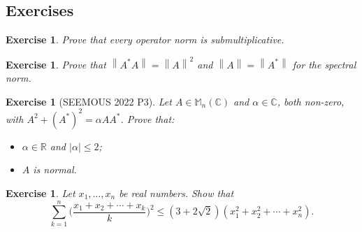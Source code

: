 \documentclass[12pt]{article}
\newcommand{\norm}[1]{\left\lVert #1 \right\rVert}
\theoremstyle{breakplain}
\theoremstyle{breakdef}
\newtheorem{ex}[subsubsection]{Exercise}
\theoremstyle{remark}
\begin{document}
\subsection{Exercises}
\begin{ex}
    Prove that every operator norm is submultiplicative.
\end{ex}
\begin{ex}
    Prove that $\norm{A^*A}=\norm{A}^2$ and $\norm{A}=\norm{A^*}$ for the spectral norm.
\end{ex}
\begin{ex}[SEEMOUS 2022 P3]\label{S22P3}
    Let $A\in \mathbb{M}_n(\mathbb{C})$ and $\alpha\in \mathbb{C}$, both non-zero, with $A^2+(A^*)^2=\alpha A A^*$. Prove that:
    \begin{itemize}
        \item $\alpha\in \mathbb{R}$ and $|\alpha|\leq 2$;
        \item $A$ is normal.
    \end{itemize}
\end{ex}
\begin{ex}
    Let $x_1,\ldots,x_n$ be real numbers. Show that
    \[\sum_{k=1}^n\Big(\frac{x_1+x_2+\cdots +x_k}{k}\Big)^2\leq (3+2\sqrt{2})(x_1^2+x_2^2+ \cdots + x_n^2).\]
\end{ex}

\newpage
\end{document}

